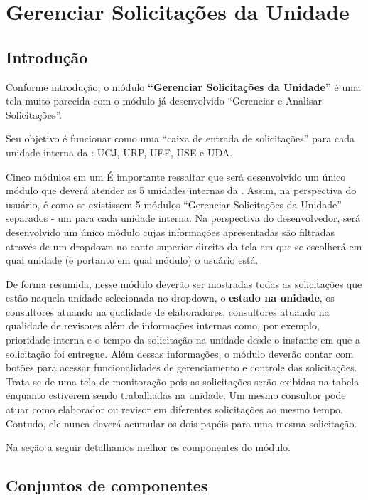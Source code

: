 \chapter{Gerenciar Solicitações da Unidade}
\label{detalhes:ger-os-unid}

\section{Introdução}

Conforme introdução, o módulo \textbf{``Gerenciar Solicitações da Unidade''} é uma tela muito parecida com o módulo já desenvolvido ``Gerenciar e Analisar Solicitações''. 

Seu objetivo é funcionar como uma ``caixa de entrada de solicitações'' para cada unidade interna da \ASSEL: UCJ, URP, UEF, USE e UDA.


	\begin{importante}{Cinco módulos em um}
		É importante ressaltar que será desenvolvido um único módulo que deverá atender as 5 unidades internas da \ASSEL. Assim, na perspectiva do usuário, é como se existissem 5 módulos ``Gerenciar Solicitações da Unidade'' separados - um para cada unidade interna. Na perspectiva do desenvolvedor, será desenvolvido um único módulo cujas informações apresentadas são filtradas através de um dropdown no canto superior direito da tela em que se escolherá em qual unidade (e portanto em qual módulo) o usuário está.
	\end{importante}


	De forma resumida, nesse módulo deverão ser mostradas todas as solicitações que estão naquela unidade selecionada no dropdown, o \textbf{estado na unidade}, os consultores atuando na qualidade de elaboradores, consultores atuando na qualidade de revisores além de informações internas como, por exemplo, prioridade interna e o tempo da solicitação na unidade desde o instante em que a solicitação foi entregue. Além dessas informações, o módulo deverão contar com botões para acessar funcionalidades de gerenciamento e controle das solicitações. Trata-se de uma tela de monitoração pois as solicitações serão exibidas na tabela enquanto estiverem sendo trabalhadas na unidade. Um mesmo consultor pode atuar como elaborador ou revisor em diferentes solicitações ao mesmo tempo. Contudo, ele nunca deverá acumular os dois papéis para uma mesma solicitação.

	Na seção a seguir detalhamos melhor os componentes do módulo.

\section{Conjuntos de componentes}

